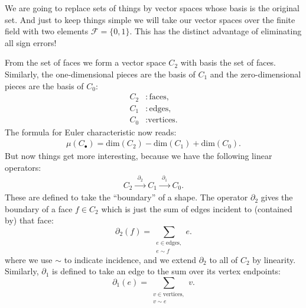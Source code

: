 \documentclass[11pt,twoside,openright]{report}
\newcommand{\Field}{\mathcal{F}}
\def\euler{\mu}
\begin{document}
We are going to replace sets of things by vector
spaces whose basis is the original set.
And just to keep things simple we will 
take our vector spaces over the finite field with
two elements $\Field=\{0, 1\}.$
This has the distinct advantage
of eliminating all sign errors!

From the set of faces we form a vector space
$C_2$ with basis the set of faces.
Similarly, the one-dimensional pieces are the basis of $C_1$
and the zero-dimensional pieces are the basis of $C_0$:
\begin{align*}
    C_2 &: \mbox{faces},\\
    C_1 &: \mbox{edges},\\
    C_0 &: \mbox{vertices.}
\end{align*}
The formula for Euler characteristic now reads:
\begin{align}\label{EulerEq}
    \euler(C_{\bullet}) = \mbox{dim}(C_2) - \mbox{dim}(C_1) + \mbox{dim}(C_0).
\end{align}
But now things get more interesting,
because we have the following linear operators:
\begin{align}\label{Sequence}
    C_2 \xrightarrow{\ \ \partial_2\ \ } C_1 \xrightarrow{\ \ \partial_1\ \ } C_0.
\end{align}
These are defined to take the ``boundary'' of a shape. 
The operator $\partial_2$ gives the boundary of a face $f\in C_2$
which is just the sum of edges incident to (contained by) that face:
$$
    \partial_2(f) = \sum_{\substack{e\in \text{edges},\\e\sim f}} e.
$$
where we use $\sim$ to indicate incidence, and we extend
$\partial_2$ to all of $C_2$ by linearity.
Similarly, $\partial_1$ is defined to take an edge
to the sum over its vertex endpoints:
$$
    \partial_1(e) = \sum_{\substack{v\in \text{vertices},\\v\sim e}} v.
$$
\end{document}
